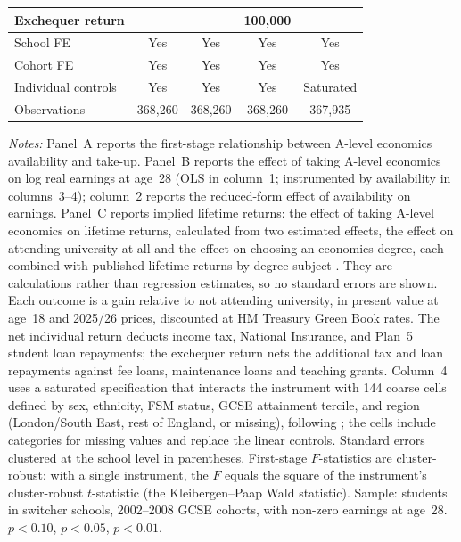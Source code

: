 \begin{table}[htbp]
\begin{tabular}{l cccc}
Exchequer return                      &            &            & 100,000 &          \\
\midrule
School FE                             & Yes        & Yes        & Yes        & Yes          \\
Cohort FE                             & Yes        & Yes        & Yes        & Yes          \\
Individual controls                   & Yes        & Yes        & Yes        & Saturated    \\
\addlinespace
Observations                          & 368,260         & 368,260         & 368,260         & 367,935           \\
\bottomrule
\end{tabular}
\begin{minipage}{\textwidth}
\smallskip
\footnotesize
\textit{Notes:} Panel~A reports the first-stage relationship between A-level economics availability and take-up. Panel~B reports the effect of taking A-level economics on log real earnings at age~28 (OLS in column~1; instrumented by availability in columns~3--4); column~2 reports the reduced-form effect of availability on earnings. Panel~C reports implied lifetime returns: the effect of taking A-level economics on lifetime returns, calculated from two estimated effects, the effect on attending university at all and the effect on choosing an economics degree, each combined with published lifetime returns by degree subject \citep{britton2026lifetime}. They are calculations rather than regression estimates, so no standard errors are shown. Each outcome is a gain relative to not attending university, in present value at age~18 and 2025/26 prices, discounted at HM Treasury Green Book rates. The net individual return deducts income tax, National Insurance, and Plan~5 student loan repayments; the exchequer return nets the additional tax and loan repayments against fee loans, maintenance loans and teaching grants. Column~4 uses a saturated specification that interacts the instrument with 144 coarse cells defined by sex, ethnicity, FSM status, GCSE attainment tercile, and region (London/South East, rest of England, or missing), following \citet{blandhol2022tsls}; the cells include categories for missing values and replace the linear controls. Standard errors clustered at the school level in parentheses. First-stage $F$-statistics are cluster-robust: with a single instrument, the $F$ equals the square of the instrument's cluster-robust $t$-statistic (the Kleibergen--Paap Wald statistic). Sample: students in switcher schools, 2002--2008 GCSE cohorts, with non-zero earnings at age~28. \sym{*} $p<0.10$, \sym{**} $p<0.05$, \sym{***} $p<0.01$.
\end{minipage}
\end{table}
